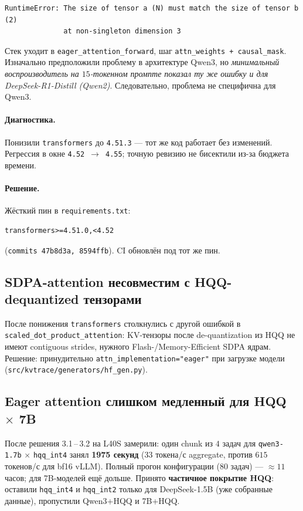 \documentclass[11pt, a4paper]{article}
\newcommand{\code}[1]{\texttt{#1}}
\begin{document}
\begin{lstlisting}
RuntimeError: The size of tensor a (N) must match the size of tensor b (2)
              at non-singleton dimension 3
\end{lstlisting}

Стек уходит в \code{eager\_attention\_forward}, шаг
\code{attn\_weights + causal\_mask}. Изначально предположили проблему в
архитектуре Qwen3, но \emph{минимальный воспроизводитель на $15$-токенном
промпте показал ту же ошибку и для DeepSeek-R1-Distill (Qwen2)}.
Следовательно, проблема не специфична для Qwen3.

\paragraph{Диагностика.} Понизили \code{transformers} до \code{4.51.3} —
тот же код работает без изменений. Регрессия в окне \code{4.52} \,$\to$\,
\code{4.55}; точную ревизию не бисектили из-за бюджета времени.

\paragraph{Решение.} Жёсткий пин в \code{requirements.txt}:
\begin{lstlisting}
transformers>=4.51.0,<4.52
\end{lstlisting}
(\code{commits 47b8d3a, 8594ffb}). CI обновлён под тот же пин.

\subsection{SDPA-attention несовместим с HQQ-dequantized тензорами}

После понижения \code{transformers} столкнулись с другой ошибкой в
\code{scaled\_dot\_product\_attention}: KV-тензоры после de-quantization
из HQQ не имеют contiguous strides, нужного Flash-/Memory-Efficient SDPA
ядрам. Решение: принудительно \code{attn\_implementation="eager"} при
загрузке модели (\code{src/kvtrace/generators/hf\_gen.py}).

\subsection{Eager attention слишком медленный для HQQ $\times$ 7B}

После решения 3.1\,--\,3.2 на L40S замерили: один chunk из $4$ задач для
\code{qwen3-1.7b} $\times$ \code{hqq\_int4} занял \textbf{1975 секунд}
($33$ токена/с aggregate, против $615$ токенов/с для bf16 vLLM). Полный
прогон конфигурации ($80$ задач) — $\approx 11$ часов; для 7B-моделей
ещё дольше. Принято \textbf{частичное покрытие HQQ}: оставили
\code{hqq\_int4} и \code{hqq\_int2} только для DeepSeek-1.5B
(уже собранные данные), пропустили Qwen3+HQQ и 7B+HQQ.
\end{document}
